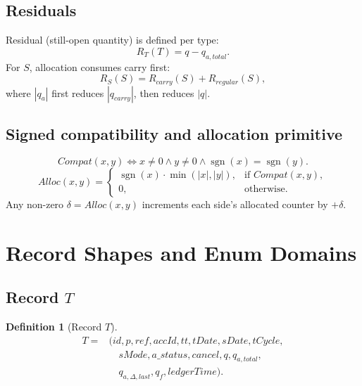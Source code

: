 \documentclass[sigconf]{acmart}
\newtheorem{definition}{Definition}
\begin{document}
\subsection{Residuals}
Residual (still-open quantity) is defined per type:
\[
R_T(T)=q-q_{a,total}.
\]
For $S$, allocation consumes carry first:
\[
R_S(S)=R_{carry}(S)+R_{regular}(S),
\]
where $|q_a|$ first reduces $|q_{carry}|$, then reduces $|q|$.

\subsection{Signed compatibility and allocation primitive}
\[
Compat(x,y)\iff x\neq 0\land y\neq 0\land \operatorname{sgn}(x)=\operatorname{sgn}(y).
\]
\[
Alloc(x,y)=
\begin{cases}
\operatorname{sgn}(x)\cdot \min(|x|,|y|), & \text{if } Compat(x,y),\\
0, & \text{otherwise}.
\end{cases}
\]
Any non-zero $\delta=Alloc(x,y)$ increments each side's allocated counter by $+\delta$.

\section{Record Shapes and Enum Domains}

\subsection{Record $T$}
\begin{definition}[Record $T$]
\[
\begin{aligned}
T={}&(id,p,ref,accId,tt,tDate,sDate,tCycle,\\
&\quad sMode,a\_status,cancel,q,q_{a,total},\\
&\quad q_{a,\Delta,last},q_f,ledgerTime).
\end{aligned}
\]
\end{definition}
\end{document}
